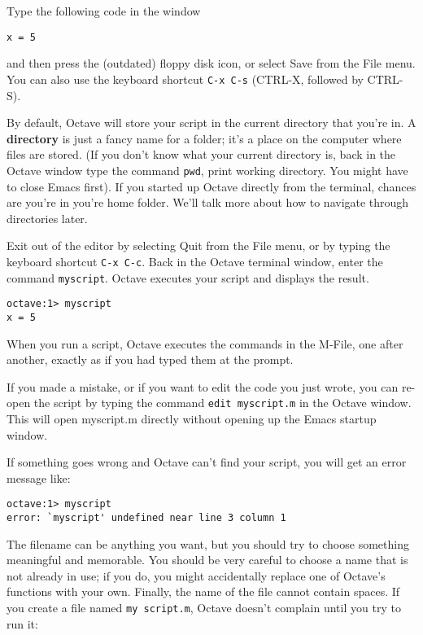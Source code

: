Type the following code in the window

\begin{verbatim}
x = 5
\end{verbatim}

and then press the (outdated) floppy disk icon, or select {\sf Save}
from the {\sf File} menu. You can also use the keyboard shortcut {\tt C-x C-s}
(CTRL-X, followed by CTRL-S).

By default, Octave will store your script in the current directory that
you're in. A {\bf directory} is just a fancy name for a folder; it's a place
on the computer where files are stored. (If you don't know what your current
directory is, back in the
Octave window type the command {\tt pwd}, print working directory. You might
have to close Emacs first). If you started up Octave directly from the terminal,
chances are you're in you're home folder. We'll talk more about how to navigate
through directories later.

Exit out of the editor by selecting {\sf Quit} from the {\sf File} menu, or by
typing the keyboard shortcut {\tt C-x C-c}. Back in the Octave terminal window,
enter the command {\tt myscript}. Octave executes your script and displays
the result.

\begin{verbatim}
octave:1> myscript
x = 5
\end{verbatim}

When you run a script, Octave executes the commands in the M-File, one
after another, exactly as if you had typed them at the prompt.

If you made a mistake, or if you want to edit the code you just wrote, you can
re-open the script by typing the command {\tt edit myscript.m} in the Octave
window. This will open myscript.m directly without opening up the Emacs startup
window.

If something goes wrong and Octave can't find your script, you will
get an error message like:

\begin{verbatim}
octave:1> myscript
error: `myscript' undefined near line 3 column 1
\end{verbatim}

The filename can be anything you want, but you should try to choose
something meaningful and memorable. You should be very careful to choose a
name that is not already in use; if you do, you might accidentally
replace one of Octave's functions with your own.
Finally, the name of the file cannot contain spaces. If you create
a file named {\tt my script.m}, Octave doesn't complain until you try
to run it:

